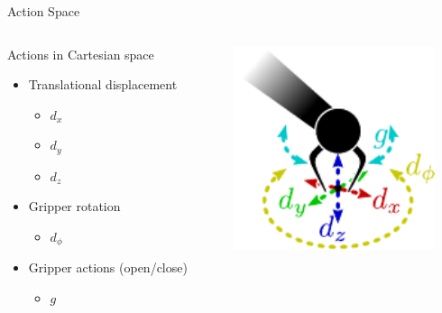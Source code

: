 \begin{frame}{Action Space}{}
    \begin{columns}%
        \begin{column}{0.4\textwidth}%
            \begin{block}{Actions in Cartesian space}
                \begin{itemize}
                    \item Translational displacement
                          \begin{itemize}
                              \item \(d_{x}\)
                              \item \(d_{y}\)
                              \item \(d_{z}\)
                          \end{itemize}
                    \item Gripper rotation
                          \begin{itemize}
                              \item \(d_{\phi}\)
                          \end{itemize}
                    \item Gripper actions (open/close)
                          \begin{itemize}
                              \item \(g\)
                          \end{itemize}
                \end{itemize}
            \end{block}
        \end{column}
        \begin{column}{0.6\textwidth}%
            \centering
            \includegraphics[height=6cm]{graphics/action_space.pdf}
        \end{column}
    \end{columns}
\end{frame}

